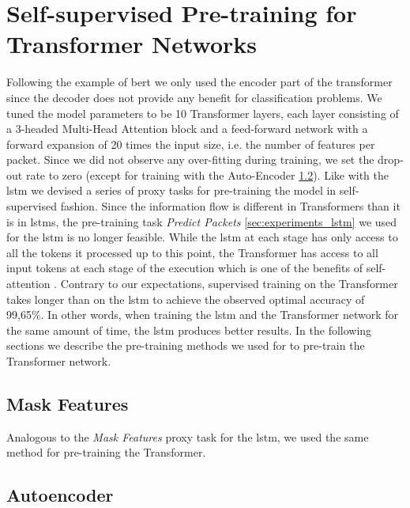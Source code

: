 \section{Self-supervised Pre-training for Transformer Networks} \label{sec:experiments_transformer}

Following the example of \gls{bert} we only used the encoder part of the transformer since the decoder does not provide any benefit for classification problems. We tuned the model parameters to be 10 Transformer layers, each layer consisting of a 3-headed Multi-Head Attention block and a feed-forward network with a forward expansion of 20 times the input size, i.e. the number of features per packet. Since we did not observe any over-fitting during training, we set the drop-out rate to zero (except for training with the Auto-Encoder \ref{sec:experiments_transformer_autoencoder}). 
Like with the \gls{lstm} we devised a series of proxy tasks for pre-training the model in self-supervised fashion. Since the information flow is different in Transformers than it is in \glspl{lstm}, the pre-training task \textit{Predict Packets} \ref{sec:experiments_lstm} we used for the \gls{lstm} is no longer feasible. While the \gls{lstm} at each stage has only access to all the tokens it processed up to this point, the Transformer has access to all input tokens at each stage of the execution which is one of the benefits of self-attention \cite{attention}. Contrary to our expectations, supervised training on the Transformer takes longer than on the \gls{lstm} to achieve the observed optimal accuracy of 99,65\%. In other words, when training the \gls{lstm} and the Transformer network for the same amount of time, the \gls{lstm} produces better results. In the following sections we describe the pre-training methods we used for to pre-train the Transformer network.

\subsection{Mask Features} \label{sec:experiments_transformer_mask_features}

Analogous to the \textit{Mask Features} proxy task for the \gls{lstm}, we used the same method for pre-training the Transformer.

\subsection{Autoencoder} \label{sec:experiments_transformer_autoencoder}

